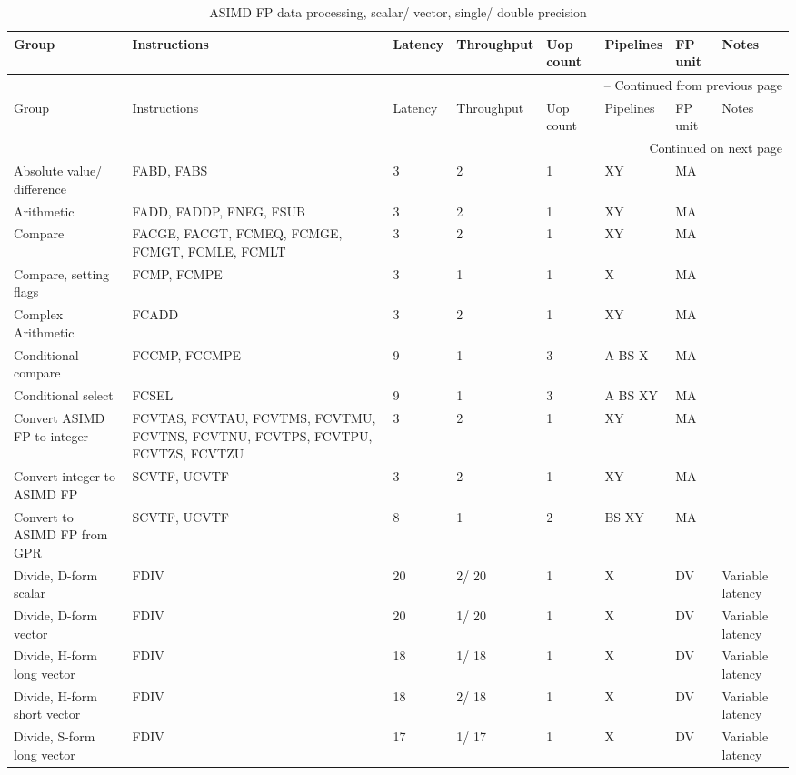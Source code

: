 \begin{longtable}{|p{1in}|p{1in}|l|l|l|p{1in}|l|p{1in}|}
\caption{ASIMD FP data processing, scalar/ vector, single/ double precision} \\
\hline
Group & Instructions & Latency & Throughput & Uop count & Pipelines & FP unit & Notes\\
\hline
\endfirsthead
\hline
\multicolumn{8}{|r|}{{\tablename\ \thetable{} -- Continued from previous page}} \\
\hline
Group & Instructions & Latency & Throughput & Uop count & Pipelines & FP unit & Notes\\
\hline
\endhead
\hline
\multicolumn{8}{|r|}{{Continued on next page}} \\
\hline
\endfoot
\hline
\endlastfoot
Absolute value/ difference & FABD, FABS & 3 & 2 & 1 & XY & MA & \\
\hline
Arithmetic & FADD, FADDP, FNEG, FSUB & 3 & 2 & 1 & XY & MA & \\
\hline
Compare & FACGE, FACGT, FCMEQ, FCMGE, FCMGT, FCMLE, FCMLT & 3 & 2 & 1 & XY & MA & \\
\hline
Compare, setting flags & FCMP, FCMPE & 3 & 1 & 1 & X & MA & \\
\hline
Complex Arithmetic & FCADD & 3 & 2 & 1 & XY & MA & \\
\hline
Conditional compare & FCCMP, FCCMPE & 9 & 1 & 3 & A BS X & MA & \\
\hline
Conditional select & FCSEL & 9 & 1 & 3 & A BS XY & MA & \\
\hline
Convert ASIMD FP to integer & FCVTAS, FCVTAU, FCVTMS, FCVTMU, FCVTNS, FCVTNU, FCVTPS, FCVTPU, FCVTZS, FCVTZU & 3 & 2 & 1 & XY & MA & \\
\hline
Convert integer to ASIMD FP & SCVTF, UCVTF & 3 & 2 & 1 & XY & MA & \\
\hline
Convert to ASIMD FP from GPR & SCVTF, UCVTF & 8 & 1 & 2 & BS XY & MA & \\
\hline
Divide, D-form scalar & FDIV & 20 & 2/ 20 & 1 & X & DV & Variable latency\\
\hline
Divide, D-form vector & FDIV & 20 & 1/ 20 & 1 & X & DV & Variable latency\\
\hline
Divide, H-form long vector & FDIV & 18 & 1/ 18 & 1 & X & DV & Variable latency\\
\hline
Divide, H-form short vector & FDIV & 18 & 2/ 18 & 1 & X & DV & Variable latency\\
\hline
Divide, S-form long vector & FDIV & 17 & 1/ 17 & 1 & X & DV & Variable latency\\

\end{longtable}
